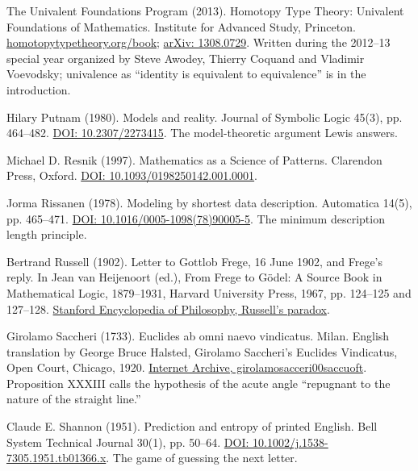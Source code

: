 \documentclass[11pt,twoside]{article}
\theoremstyle{thielethm}
\theoremstyle{thieledef}
\theoremstyle{thieledef}
\theoremstyle{thieledef}
\theoremstyle{thielethm}
\theoremstyle{thieleobs}
\theoremstyle{thielethm}
\begin{document}
\noindent The Univalent Foundations Program (2013). Homotopy Type Theory: Univalent Foundations of Mathematics. Institute for Advanced Study, Princeton. \href{https://homotopytypetheory.org/book/}{homotopytypetheory.org/book}; \href{https://arxiv.org/abs/1308.0729}{arXiv: 1308.0729}. Written during the 2012--13 special year organized by Steve Awodey, Thierry Coquand and Vladimir Voevodsky; univalence as ``identity is equivalent to equivalence'' is in the introduction.
\par\medskip

\noindent Hilary Putnam (1980). Models and reality. Journal of Symbolic Logic 45(3), pp. 464--482. \href{https://doi.org/10.2307/2273415}{DOI: 10.2307/2273415}. The model-theoretic argument Lewis answers.
\par\medskip

\noindent Michael D. Resnik (1997). Mathematics as a Science of Patterns. Clarendon Press, Oxford. \href{https://doi.org/10.1093/0198250142.001.0001}{DOI: 10.1093/0198250142.001.0001}.
\par\medskip

\noindent Jorma Rissanen (1978). Modeling by shortest data description. Automatica 14(5), pp. 465--471. \href{https://doi.org/10.1016/0005-1098(78)90005-5}{DOI: 10.1016/0005-1098(78)90005-5}. The minimum description length principle.
\par\medskip

\noindent Bertrand Russell (1902). Letter to Gottlob Frege, 16 June 1902, and Frege's reply. In Jean van Heijenoort (ed.), From Frege to G\"odel: A Source Book in Mathematical Logic, 1879--1931, Harvard University Press, 1967, pp. 124--125 and 127--128. \href{https://plato.stanford.edu/entries/russell-paradox/}{Stanford Encyclopedia of Philosophy, Russell's paradox}.
\par\medskip

\noindent Girolamo Saccheri (1733). Euclides ab omni naevo vindicatus. Milan. English translation by George Bruce Halsted, Girolamo Saccheri's Euclides Vindicatus, Open Court, Chicago, 1920. \href{https://archive.org/details/girolamosacceri00saccuoft}{Internet Archive, girolamosacceri00saccuoft}. Proposition XXXIII calls the hypothesis of the acute angle ``repugnant to the nature of the straight line.''
\par\medskip

\noindent Claude E. Shannon (1951). Prediction and entropy of printed English. Bell System Technical Journal 30(1), pp. 50--64. \href{https://doi.org/10.1002/j.1538-7305.1951.tb01366.x}{DOI: 10.1002/j.1538-7305.1951.tb01366.x}. The game of guessing the next letter.
\par\medskip
\end{document}
